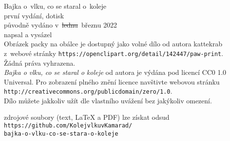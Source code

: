 \documentclass[a5paper, twoside,12pt]{book}
\begin{document}
\thispagestyle{empty}
\vspace*{\fill}
\begin{center}
    Bajka o~vlku, co se staral o~koleje\\
    \vspace{\baselineskip}
    první vydání, dotisk\\
    původně vydáno v~\sout{lednu}~březnu 2022\\
    \vspace{\baselineskip}
    napsal a vysázel \\
    \vspace{\baselineskip}
    Obrázek packy na obálce je dostupný jako volné dílo od autora kattekrab z~webové stránky \texttt{https://openclipart.org/detail/142447/paw-print}.\\
    \vspace{\baselineskip}
    Žádná práva vyhrazena.\\
    \emph{Bajka o vlku, co se staral o koleje} od autora  je výdána pod licencí CC0 1.0 Universal. Pro zobrazení plného znění licence navštivte webovou stránku \texttt{http://creativecommons.org/publicdomain/zero/1.0}.\\
    Dílo můžete jakkoliv užít dle vlastního uvážení bez jakýkoliv omezení.\\
    
\end{center}
\vspace*{\fill}
\begin{center}
zdrojové soubory (text, \LaTeX{} a PDF) lze získat odsud\\
\texttt{https://github.com/KolejvlkuvKamarad/\\bajka-o-vlku-co-se-stara-o-koleje}\\
\end{center}
\newpage

\thispagestyle{empty}
\vspace*{\fill}
\begin{center}
    
\end{center}
\vspace*{\fill}
\end{document}

